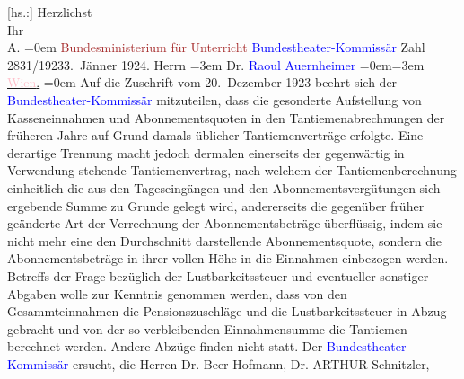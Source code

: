            {[}hs.:{]} Herzlichst{\\[\baselineskip]}Ihr{\\[\baselineskip]}\spacefill\mbox{A.}\pend
           \leftskip=0em{}{\bigskip}\pstart
           \noindent{}\raggedleft{}{\pb}\textcolor{brown}{Bundesministerium für Unterricht}{}\ledrightnote{\textcolor{brown}{Ministerium für Unterricht}}\pend
           \pstart
           \noindent{}\raggedleft{}\textcolor{blue}{Bundestheater-Kommissär}{}\pend
           \pstart
           \noindent{}Zahl 2831/1923\hfill 3. Jänner 1924.\pend
           \pstart
           Herrn\pend
           \leftskip=3em{}\pstart
           \noindent{}Dr. \textcolor{blue}{Raoul Auernheimer}{}\ledrightnote{\textcolor{blue}{Raoul Auernheimer}}\pend
           \leftskip=0em{}\leftskip=3em{}\pstart
           \uline{\textcolor{pink}{Wien}{}\ledrightnote{\textcolor{pink}{Wien}}.}\pend
           \leftskip=0em{}\pstart
           Auf die Zuschrift vom 20. Dezember 1923 beehrt sich der \textcolor{blue}{Bundestheater-Kommissär}{}
               mitzuteilen, dass die gesonderte Aufstellung von Kasseneinnahmen und
               Abonnementsquoten in den Tantiemenabrechnungen der früheren Jahre auf Grund damals
               üblicher Tantiemenverträge erfolgte. Eine derartige Trennung macht jedoch dermalen
               einerseits der gegenwärtig in Verwendung stehende Tantiemenvertrag, nach welchem der
               Tantiemenberechnung einheitlich die aus den Tageseingängen und den
               Abonnementsvergütungen sich ergebende Summe zu Grunde gelegt wird, andererseits die
               gegenüber früher geänderte Art der Verrechnung der Abonnementsbeträge überflüssig,
                  {\pb}indem sie nicht mehr eine den Durchschnitt
               darstellende  Abonnementsquote, sondern die
               Abonnementsbeträge in ihrer vollen Höhe in die Einnahmen einbezogen werden.\pend
           \pstart
           Betreffs der Frage bezüglich der Lustbarkeitssteuer und eventueller sonstiger Abgaben
               wolle zur Kenntnis genommen werden, dass von den Gesammteinnahmen die
               Pensionszuschläge und die Lustbarkeitssteuer in Abzug gebracht und von der so
               verbleibenden Einnahmensumme die Tantiemen berechnet werden. Andere Abzüge finden
               nicht statt.\pend
           \pstart
           Der \textcolor{blue}{Bundestheater-Kommissär}{}
               ersucht, die Herren Dr. Beer-Hofmann, Dr. ARTHUR Schnitzler,
